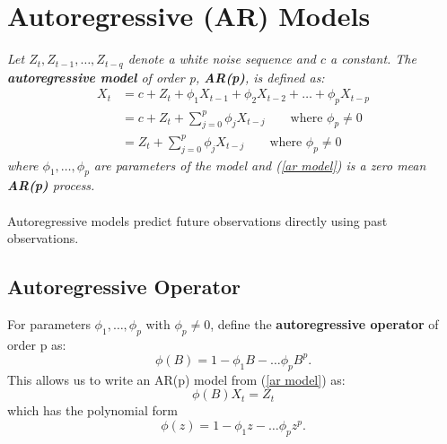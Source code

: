 \documentclass{article}
\begin{document}
\section{Autoregressive (AR) Models}
\textit{Let $Z_t, Z_{t-1}, \ldots, Z_{t-q}$ denote a white noise sequence and $c$ a constant. The \textbf{autoregressive model} of order p, \textbf{AR(p)}, is defined as:
\begin{align}\label{ar model}
    X_t &= c + Z_t + \phi_1 X_{t-1} + \phi_2 X_{t-2} + \ldots + \phi_p X_{t-p}\nonumber\\
    &= c + Z_t + \sum_{j=0}^p \phi_j X_{t-j} \qquad \text{where } \phi_p \neq 0\nonumber\\
    &= Z_t + \sum_{j=0}^p \phi_j X_{t-j} \qquad \text{where } \phi_p \neq 0
\end{align}
where $\phi_1, \ldots, \phi_p$ are parameters of the model and (\ref{ar model}) is a zero mean \textbf{AR(p)} process.\\\\
}
Autoregressive models predict future observations directly using past observations.
\subsection{Autoregressive Operator}
For parameters $\phi_1, \ldots, \phi_p$ with $\phi_p \neq 0$, define the \textbf{autoregressive operator} of order p as:
\begin{equation}\label{ar operator}
    \phi(B)=1-\phi_1B-\ldots \phi_p B^p.
\end{equation}
This allows us to write an AR(p) model from (\ref{ar model}) as:
\begin{equation}
    \phi(B)X_t = Z_t
\end{equation}
which has the polynomial form
\begin{equation}\label{ar poly}
    \phi(z)=1-\phi_1z-\ldots \phi_p z^p.
\end{equation}
\end{document}

